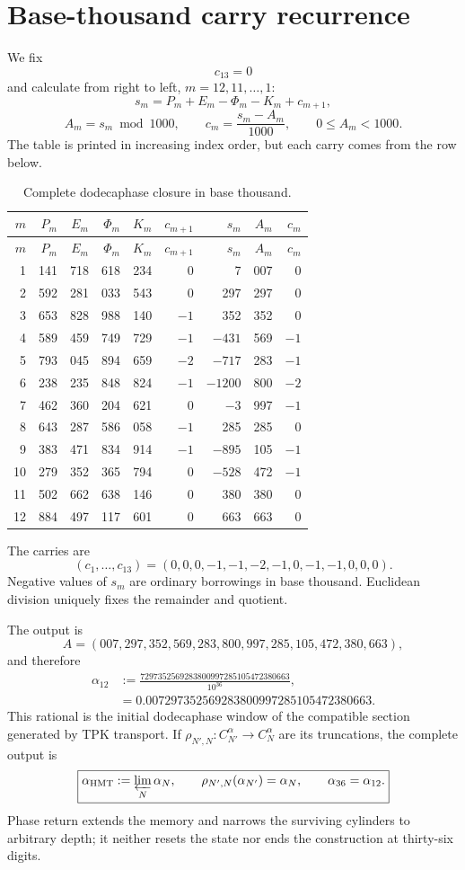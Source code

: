 \section{Base-thousand carry recurrence}

We fix
\[
c_{13}=0
\]
and calculate from right to left, \(m=12,11,\ldots,1\):
\[
s_m=P_m+E_m-\Phi_m-K_m+c_{m+1},
\]
\[
A_m=s_m\bmod1000,
\qquad
c_m=\frac{s_m-A_m}{1000},
\qquad0\le A_m<1000.
\]
The table is printed in increasing index order, but each carry comes from the row
below.

\begingroup
\scriptsize
\setlength{\tabcolsep}{3.3pt}
\begin{longtable}{@{}r|rrrr|rr|rr@{}}
\caption{Complete dodecaphase closure in base thousand.}\label{tab:acarreo-alpha}\\
\toprule
\(m\)&\(P_m\)&\(E_m\)&\(\Phi_m\)&\(K_m\)&\(c_{m+1}\)&\(s_m\)&\(A_m\)&\(c_m\)\\
\midrule
\endfirsthead
\toprule
\(m\)&\(P_m\)&\(E_m\)&\(\Phi_m\)&\(K_m\)&\(c_{m+1}\)&\(s_m\)&\(A_m\)&\(c_m\)\\
\midrule
\endhead
1&141&718&618&234&0&7&007&0\\
2&592&281&033&543&0&297&297&0\\
3&653&828&988&140&\(-1\)&352&352&0\\
4&589&459&749&729&\(-1\)&\(-431\)&569&\(-1\)\\
5&793&045&894&659&\(-2\)&\(-717\)&283&\(-1\)\\
6&238&235&848&824&\(-1\)&\(-1200\)&800&\(-2\)\\
7&462&360&204&621&0&\(-3\)&997&\(-1\)\\
8&643&287&586&058&\(-1\)&285&285&0\\
9&383&471&834&914&\(-1\)&\(-895\)&105&\(-1\)\\
10&279&352&365&794&0&\(-528\)&472&\(-1\)\\
11&502&662&638&146&0&380&380&0\\
12&884&497&117&601&0&663&663&0\\
\bottomrule
\end{longtable}
\endgroup

The carries are
\[
(c_1,\ldots,c_{13})
=(0,0,0,-1,-1,-2,-1,0,-1,-1,0,0,0).
\]
Negative values of \(s_m\) are ordinary borrowings in base thousand. Euclidean
division uniquely fixes the remainder and quotient.

The output is
\[
\boxed{
A=(007,297,352,569,283,800,997,285,105,472,380,663),}
\]
and therefore
\[
\boxed{
\begin{aligned}
\alpha_{12}
&:=\frac{7297352569283800997285105472380663}{10^{36}},\\
&=0.007297352569283800997285105472380663.
\end{aligned}}
\]
This rational is the initial dodecaphase window of the compatible section
generated by TPK transport. If
\(\rho_{N',N}:C_{N'}^\alpha\to C_N^\alpha\) are its truncations, the
complete output is
\[
 \boxed{
 \alpha_{\mathrm{HMT}}
 :=\varprojlim_N\alpha_N,\qquad
 \rho_{N',N}(\alpha_{N'})=\alpha_N,\qquad
 \alpha_{36}=\alpha_{12}.}
\]
Phase return extends the memory and narrows the surviving
cylinders to arbitrary depth; it neither resets the state nor ends the
construction at thirty-six digits.

